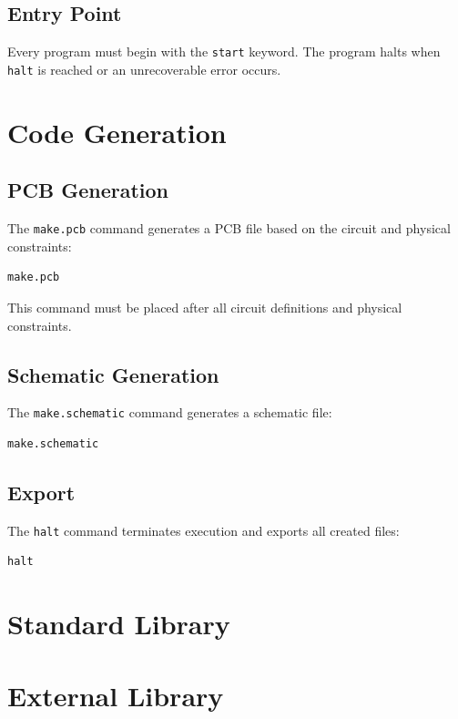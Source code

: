 \documentclass{report}
\begin{document}
\section{Entry Point}
Every program must begin with the \texttt{start} keyword. The program halts when \texttt{halt} is reached or an unrecoverable error occurs.


\chapter{Code Generation}

\section{PCB Generation}
The \texttt{make.pcb} command generates a PCB file based on the circuit and physical constraints:
\begin{verbatim}
make.pcb
\end{verbatim}
This command must be placed after all circuit definitions and physical constraints.

\section{Schematic Generation}
The \texttt{make.schematic} command generates a schematic file:
\begin{verbatim}
make.schematic
\end{verbatim}

\section{Export}
The \texttt{halt} command terminates execution and exports all created files:
\begin{verbatim}
halt
\end{verbatim}


\chapter{Standard Library}


\chapter{External Library}
\end{document}
